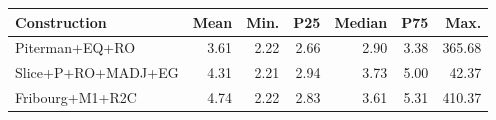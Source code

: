 \begin{tabular}{lrrrrrr}
  \hline
Construction & Mean & Min. & P25 & Median & P75 & Max. \\ 
  \hline
Piterman+EQ+RO & 3.61 & 2.22 & 2.66 & 2.90 & 3.38 & 365.68 \\ 
  Slice+P+RO+MADJ+EG & 4.31 & 2.21 & 2.94 & 3.73 & 5.00 & 42.37 \\ 
  Fribourg+M1+R2C & 4.74 & 2.22 & 2.83 & 3.61 & 5.31 & 410.37 \\ 
   \hline
\end{tabular}
